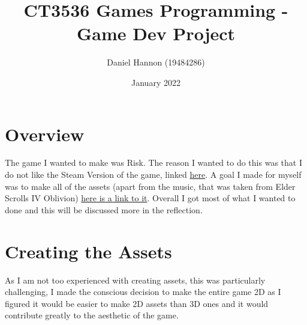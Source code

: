 \documentclass{article}
\title{CT3536 Games Programming - Game Dev Project}
\author{Daniel Hannon (19484286)}
\date{January 2022}
\begin{document}
	\maketitle
	\section{Overview}
	The game I wanted to make was Risk. The reason I wanted to do this was that I do not like the Steam Version of the game, linked \href{https://store.steampowered.com/app/1128810/RISK_Global_Domination/}{here}. A goal I made for myself was to make all of the assets (apart from the music, that was taken from Elder Scrolls IV Oblivion) \href{https://www.amazon.co.uk/dp/B07CT8Y3S4/ref=dm_ws_tlw_trk7}{here is a link to it}. Overall I got most of what I wanted to done and this will be discussed more in the reflection.
	\section{Creating the Assets}
	As I am not too experienced with creating assets, this was particularly challenging, I made the conscious decision to make the entire game 2D as I figured it would be easier to make 2D assets than 3D ones and it would contribute greatly to the aesthetic of the game. 
\end{document}

